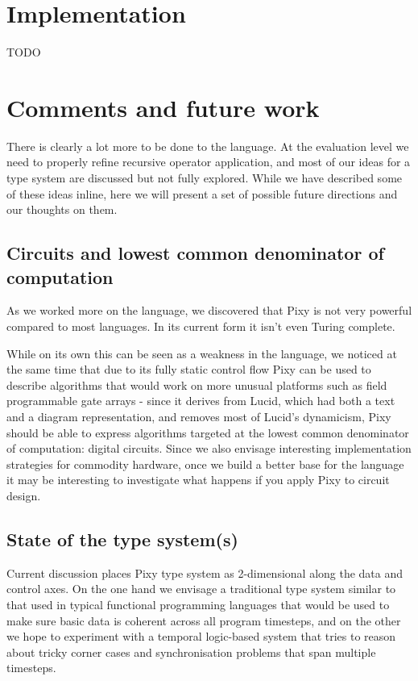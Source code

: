\documentclass{scrartcl}
\begin{document}
    \section{Implementation}
    
    TODO
    
    \section{Comments and future work}
    
    There is clearly a lot more to be done to the language. At the evaluation level we need to properly refine recursive operator application, and most of our ideas for a type system are discussed but not fully explored. While we have described some of these ideas inline, here we will present a set of possible future directions and our thoughts on them.
    
    \subsection{Circuits and lowest common denominator of computation}
    
    As we worked more on the language, we discovered that Pixy is not very powerful compared to most languages. In its current form it isn't even Turing complete.
    
    While on its own this can be seen as a weakness in the language, we noticed at the same time that due to its fully static control flow Pixy can be used to describe algorithms that would work on more unusual platforms such as field programmable gate arrays - since it derives from Lucid, which had both a text and a diagram representation, and removes most of Lucid's dynamicism, Pixy should be able to express algorithms targeted at the lowest common denominator of computation: digital circuits. Since we also envisage interesting implementation strategies for commodity hardware, once we build a better base for the language it may be interesting to investigate what happens if you apply Pixy to circuit design.
    
    \subsection{State of the type system(s)}
    
    Current discussion places Pixy type system as 2-dimensional along the data and control axes. On the one hand we envisage a traditional type system similar to that used in typical functional programming languages that would be used to make sure basic data is coherent across all program timesteps, and on the other we hope to experiment with a temporal logic-based system that tries to reason about tricky corner cases and synchronisation problems that span multiple timesteps.
    
\end{document}
